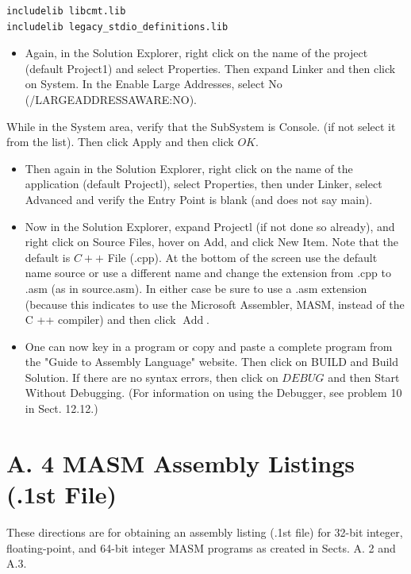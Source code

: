 \documentclass[10pt]{book}
\begin{document}
\begin{verbatim}
includelib libcmt.lib
includelib legacy_stdio_definitions.lib
\end{verbatim}

\begin{itemize}
  \item Again, in the Solution Explorer, right click on the name of the project (default Project1) and select Properties. Then expand Linker and then click on System. In the Enable Large Addresses, select No (/LARGEADDRESSAWARE:NO).
\end{itemize}

While in the System area, verify that the SubSystem is Console. (if not select it from the list). Then click Apply and then click $O K$.

\begin{itemize}
  \item Then again in the Solution Explorer, right click on the name of the application (default Projectl), select Properties, then under Linker, select Advanced and verify the Entry Point is blank (and does not say main).
  \item Now in the Solution Explorer, expand Projectl (if not done so already), and right click on Source Files, hover on Add, and click New Item. Note that the default is $C++$ File (.cpp). At the bottom of the screen use the default name source or use a different name and change the extension from .cpp to .asm (as in source.asm). In either case be sure to use a .asm extension (because this indicates to use the Microsoft Assembler, MASM, instead of the C ++ compiler) and then click $\operatorname{Add}$.
  \item One can now key in a program or copy and paste a complete program from the "Guide to Assembly Language" website. Then click on BUILD and Build Solution. If there are no syntax errors, then click on $D E B U G$ and then Start Without Debugging. (For information on using the Debugger, see problem 10 in Sect. 12.12.)
\end{itemize}

\section{A. 4 MASM Assembly Listings (.1st File)}
These directions are for obtaining an assembly listing (.1st file) for 32-bit integer, floating-point, and 64-bit integer MASM programs as created in Sects. A. 2 and A.3.
\end{document}
